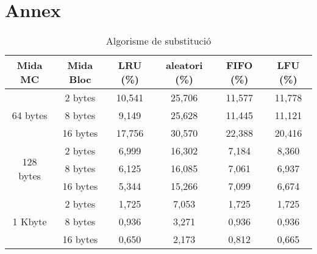 \documentclass{article}
\begin{document}
\section{Annex}
\begin{table}[!h]
\centering
\begin{tabular}{|c|c|c|c|c|c|}
\hline
Mida MC & Mida Bloc & LRU (\%) & aleatori (\%) & FIFO (\%) & LFU (\%) \\
\hline
\multirow{3}{4em}{64 bytes}     & 2 bytes                        & 10,541                        & 25,706                             & 11,577                         & 11,778                        \\
                              & 8 bytes                        & 9,149                         & 25,628                             & 11,445                         & 11,121                        \\
                              & 16 bytes                       & 17,756                        & 30,570                             & 22,388                         & 20,416                        \\
\hline
\multirow{3}{4em}{128 bytes}    & 2 bytes                        & 6,999                         & 16,302                             & 7,184                          & 8,360                         \\
                              & 8 bytes                        & 6,125                         & 16,085                             & 7,061                          & 6,937                         \\
                              & 16 bytes                       & 5,344                         & 15,266                             & 7,099                          & 6,674                         \\
\hline
\multirow{3}{4em}{1 Kbyte}      & 2 bytes                        & 1,725                         & 7,053                              & 1,725                          & 1,725                         \\
                              & 8 bytes                        & 0,936                         & 3,271                              & 0,936                          & 0,936                         \\
                              & 16 bytes                       & 0,650                         & 2,173                              & 0,812                          & 0,665                        
\\
\hline
\end{tabular}
\caption{Algorisme de substitució}
\label{tab:sub}
\end{table}
\end{document}
